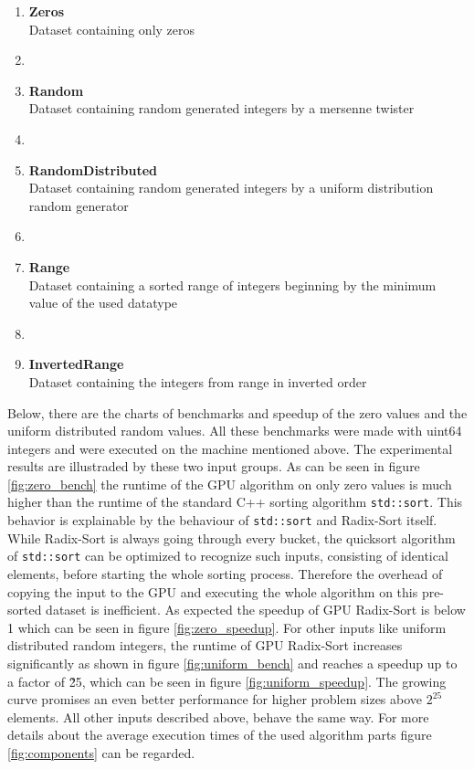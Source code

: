 \documentclass{llncs}
\begin{document}
\begin{enumerate}
  \item \textbf{Zeros}\\ Dataset containing only zeros
  \item[]
  \item \textbf{Random}\\ Dataset containing random generated integers by a mersenne twister
  \item[]
  \item \textbf{RandomDistributed}\\  Dataset containing random generated integers by a uniform distribution random generator
  \item[]
  \item \textbf{Range}\\ Dataset containing a sorted range of integers beginning by the minimum value of the used datatype
  \item[]
  \item \textbf{InvertedRange}\\ Dataset containing the integers from range in inverted order
\end{enumerate}

Below, there are the charts of benchmarks and speedup of the zero values and the uniform distributed random values. All these benchmarks were made with uint64 integers and were executed on the machine mentioned above. The experimental results are illustraded by these two input groups. As can be seen in figure \ref{fig:zero_bench} the runtime of the GPU algorithm on only zero values is much higher than the runtime of the standard C++ sorting algorithm \texttt{std::sort}. This behavior is explainable by the behaviour of \texttt{std::sort} and Radix-Sort itself. While Radix-Sort is always going through every bucket, the quicksort algorithm of \texttt{std::sort} can be optimized to recognize such inputs, consisting of identical elements, before starting the whole sorting process. Therefore the overhead of copying the input to the GPU and executing the whole algorithm on this pre-sorted dataset is inefficient. As expected the speedup of GPU Radix-Sort is below 1 which can be seen in figure \ref{fig:zero_speedup}. For other inputs like uniform distributed random integers, the runtime of GPU Radix-Sort increases significantly as shown in figure \ref{fig:uniform_bench} and reaches a speedup up to a factor of \~25, which can be seen in figure \ref{fig:uniform_speedup}. The growing curve promises an even better performance for higher problem sizes above $2^{25}$ elements. All other inputs described above, behave the same way. For more details about the average execution times of the used algorithm parts figure \ref{fig:components} can be regarded.
\end{document}
